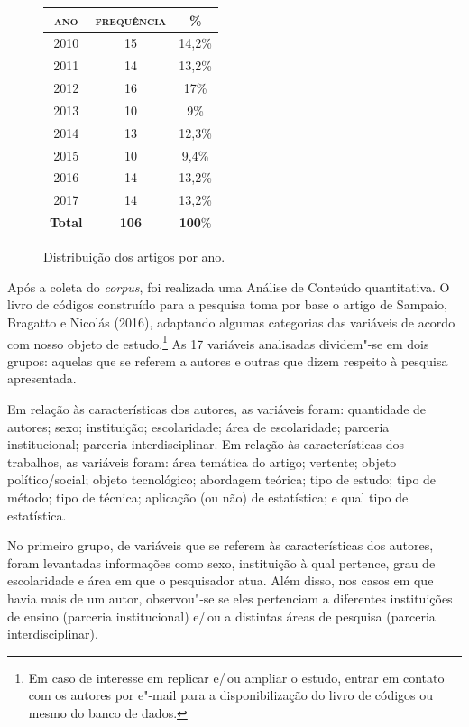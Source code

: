{\begin{figure}[!ht]
\begin{center}
\begin{tabular}{|c|c|c|}
\hline
\textsc{ano} & \textsc{frequência} & \textsc{\%} \\ \hline\hline
2010 & 15 & 14,2\% \\ \hline
2011 & 14 & 13,2\% \\ \hline
2012 & 16 & 17\% \\ \hline
2013 & 10 & 9\% \\ \hline
2014 & 13 & 12,3\% \\ \hline
2015 & 10 & 9,4\% \\ \hline
2016 & 14 & 13,2\% \\ \hline
2017 & 14 & 13,2\% \\ \hline
\textbf{Total} & \textbf{106} & \textbf{100}\% \\ \hline
\end{tabular}
\end{center}
\caption{Distribuição dos artigos por ano.\footnotemark}

\end{figure}


Após a coleta do \textit{corpus}, foi realizada uma Análise de Conteúdo
quantitativa. O livro de códigos construído para a pesquisa toma por
base o artigo de Sampaio, Bragatto e Nicolás (2016), adaptando algumas
categorias das variáveis de acordo com nosso objeto de estudo.\footnote{Em
  caso de interesse em replicar e/\,ou ampliar o estudo, entrar em contato
  com os autores por e"-mail para a disponibilização do livro de códigos
  ou mesmo do banco de dados.} As 17 variáveis analisadas
dividem"-se em dois grupos: aquelas que se referem a autores e outras
que dizem respeito à pesquisa apresentada.

Em relação às características dos autores, as variáveis foram: quantidade de autores; sexo; instituição; escolaridade; área de escolaridade; parceria institucional; parceria interdisciplinar. 
Em relação às características dos trabalhos, as variáveis foram: área temática do artigo; vertente; objeto político/social; objeto tecnológico; abordagem teórica; tipo de estudo; tipo de método; tipo de técnica; aplicação (ou não) de estatística; e qual tipo de estatística.

No primeiro grupo, de variáveis que se referem às características dos
autores, foram levantadas informações como sexo, instituição à qual
pertence, grau de escolaridade e área em que o pesquisador atua.
Além disso, nos casos em que havia mais de um autor, observou"-se se
eles pertenciam a diferentes instituições de ensino (parceria
institucional) e/\,ou a distintas áreas de pesquisa (parceria
interdisciplinar).

}
